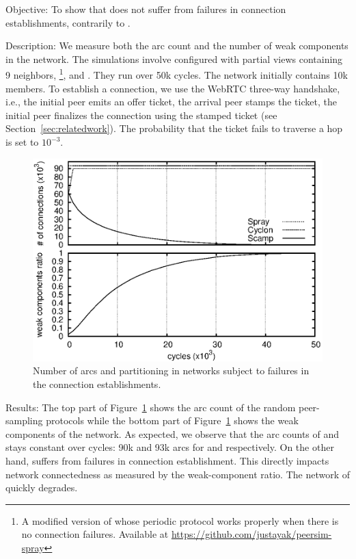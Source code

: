 \begin{asparadesc}
\item[Objective:] To show that \SPRAY does not suffer from failures in
  connection establishments, contrarily to \SCAMP.
\item[Description:] We measure both the arc count and the number of weak
  components in the network. The simulations involve \CYCLON configured with
  partial views containing 9 neighbors, \SCAMP\footnote{A modified version of
    \SCAMP whose periodic protocol works properly when there is no connection
    failures. Available at \url{https://github.com/justayak/peersim-spray}}, and
  \SPRAY. They run over 50k cycles. The network initially contains 10k members.
  To establish a connection, we use the WebRTC three-way handshake, i.e., the
  initial peer emits an offer ticket, the arrival peer stamps the ticket, the
  initial peer finalizes the connection using the stamped ticket (see
  Section~\ref{sec:relatedwork}). The probability that the ticket fails to
  traverse a hop is set to $10^{-3}$.

\begin{figure}
  \centering \includegraphics[width=\SCALE\columnwidth]{img/degen.eps}
  \caption{\label{fig:degeneration}Number of arcs and partitioning in networks
    subject to failures in the connection establishments.}
\end{figure}

\item[Results:] The top part of Figure~\ref{fig:degeneration} shows the arc
  count of the random peer-sampling protocols while the bottom part of
  Figure~\ref{fig:degeneration} shows the weak components of the network.  As
  expected, we observe that the arc counts of \CYCLON and \SPRAY stays constant
  over cycles: 90k and 93k arcs for \CYCLON and \SPRAY respectively. On the
  other hand, \SCAMP suffers from failures in connection establishment. This
  directly impacts network connectedness as measured by the weak-component
  ratio. The network of \SCAMP quickly degrades.


\end{asparadesc}
